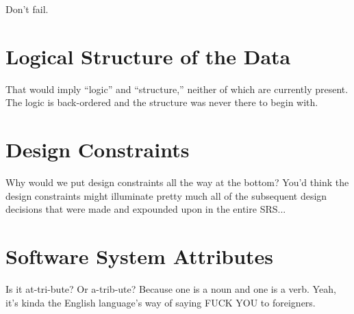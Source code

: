 \documentclass{scrreprt}
\begin{document}
Don't fail.

\section{Logical Structure of the Data}

That would imply ``logic'' and ``structure,'' neither of which are 
currently present. The logic is back-ordered and the structure was 
never there to begin with.

\section{Design Constraints}

Why would we put design constraints all the way at the bottom? You'd think 
the design constraints might illuminate pretty much all of the subsequent 
design decisions that were made and expounded upon in the entire SRS...

\section{Software System Attributes}

Is it at-tri-bute? Or a-trib-ute? Because one is a noun and one is a verb. 
Yeah, it's kinda the English language's way of saying FUCK YOU to foreigners.

\end{document}
